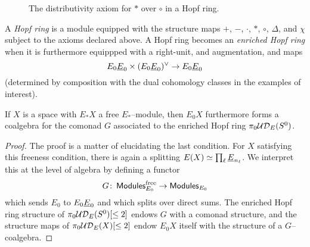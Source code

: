 \begin{figure}
\begin{center}
\end{center}
\caption{The distributivity axiom for $\ast$ over $\circ$ in a Hopf ring.}\label{DistributivityDiagram}
\end{figure}

\begin{definition}
A \textit{Hopf ring} is a module equipped with the structure maps $+$, $-$, $\cdot$, $\ast$, $\circ$, $\Delta$, and $\chi$ subject to the axioms declared above.  A Hopf ring becomes an \textit{enriched Hopf ring} when it is furthermore equippped with a right-unit, and augmentation, and maps \[E_0 \underline{\smash{E}}_{0} \times (E_0 \underline{\smash{E}}_{0})^\vee \to E_0 \underline{\smash{E}}_{0}\] (determined by composition with the dual cohomology classes in the examples of interest).
\end{definition}

\begin{lemma}\label{HopfRingFromOneRingSpectrum}
If $X$ is a space with $E_* X$ a free $E_*$--module, then $E_0 X$ furthermore forms a coalgebra for the comonad $G$ associated to the enriched Hopf ring $\pi_0 \mathcal{UD}_E(S^0)$.
\end{lemma}
\begin{proof}
The proof is a matter of elucidating the last condition.  For $X$ satisfying this freeness condition, there is again a splitting $E(X) \simeq \prod_\ell \underline{\smash{E}}_{n_\ell}$.  We interpret this at the level of algebra by defining a functor \[G\colon\thinspace \mathsf{Modules}_{E_0}^{\mathrm{free}} \to \mathsf{Modules}_{E_0}\] which sends $E_0$ to $E_0 \underline{\smash{E}}_{0}$ and which splits over direct sums.  The enriched Hopf ring structure of $\pi_0 \mathcal{UD}_E(S^0)[\le 2]$ endows $G$ with a comonad structure, and the structure maps of $\pi_0 \mathcal{UD}_E(X)[\le 2]$ endow $E_0 X$ itself with the structure of a $G$--coalgebra.
\end{proof}

